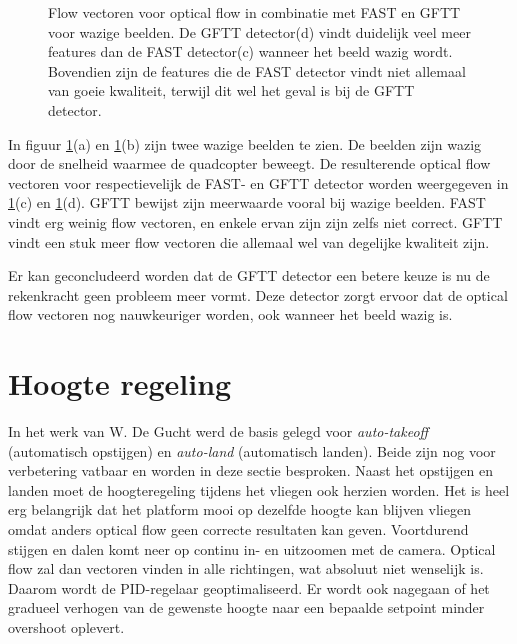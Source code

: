 \begin{figure}
\begin{center}
\hspace{0.01\linewidth}
\end{center}

\begin{center}
\hspace{0.01\linewidth}
\end{center}
\centering
\caption{Flow vectoren voor optical flow in combinatie met FAST en GFTT voor wazige beelden. De GFTT detector(d) vindt duidelijk veel meer features dan de FAST detector(c) wanneer het beeld wazig wordt. Bovendien zijn de features die de FAST detector vindt niet allemaal van goeie kwaliteit, terwijl dit wel het geval is bij de GFTT detector.}\label{fig:wazig}
\end{figure}

\npar In figuur \ref{fig:wazig}(a) en \ref{fig:wazig}(b) zijn twee wazige beelden te zien. De beelden zijn wazig door de snelheid waarmee de quadcopter beweegt. De resulterende optical flow vectoren voor respectievelijk de FAST- en GFTT detector worden weergegeven in \ref{fig:wazig}(c) en \ref{fig:wazig}(d). GFTT bewijst zijn meerwaarde vooral bij wazige beelden. FAST vindt erg weinig flow vectoren, en enkele ervan zijn zijn zelfs niet correct. GFTT vindt een stuk meer flow vectoren die allemaal wel van degelijke kwaliteit zijn.

\npar Er kan geconcludeerd worden dat de GFTT detector een betere keuze is nu de rekenkracht geen probleem meer vormt. Deze detector zorgt ervoor dat de optical flow vectoren nog nauwkeuriger worden, ook wanneer het beeld wazig is.

\section{Hoogte regeling} \label{sec:hoogtereg}
In het werk van W. De Gucht werd de basis gelegd voor \textit{auto-takeoff} (automatisch opstijgen) en \textit{auto-land} (automatisch landen). Beide zijn nog voor verbetering vatbaar en worden in deze sectie besproken. Naast het opstijgen en landen moet de hoogteregeling tijdens het vliegen ook herzien worden. Het is heel erg belangrijk dat het platform mooi op dezelfde hoogte kan blijven vliegen omdat anders optical flow geen correcte resultaten kan geven. Voortdurend stijgen en dalen komt neer op continu in- en uitzoomen met de camera. Optical flow zal dan vectoren vinden in alle richtingen, wat absoluut niet wenselijk is. Daarom wordt de PID-regelaar geoptimaliseerd. Er wordt ook nagegaan of het gradueel verhogen van de gewenste hoogte naar een bepaalde setpoint minder overshoot oplevert.

